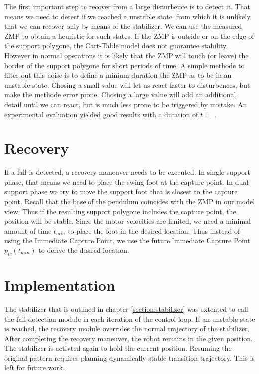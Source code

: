 \documentclass[english,ngerman]{KITreprt}
\newcommand{\fixme}[1]{{\color{red}{FIXME: #1}}}
\begin{document}
The first important step to recover from a large disturbence is to
detect it. That means we need to detect if we reached a unstable state,
from which it is unlikely that we can recover only by means of the
stabilizer. We can use the measured ZMP to obtain a heuristic for such
states. If the ZMP is outside or on the edge of the support polygone,
the Cart-Table model does not guarantee stability. However in normal
operations it is likely that the ZMP will touch (or leave) the border of
the support polygone for short periods of time. A simple methode to
filter out this noise is to define a minium duration the ZMP as to be in
an unstable state. Chosing a small value will let us react faster to
disturbences, but make the methode error prone. Chosing a large value
will add an additional detail until we can react, but is much less prone
to be triggered by mistake. An experimental evaluation yielded good
results with a duration of $t = $ \fixme{add real time here}.

\section{Recovery}\label{recovery}

If a fall is detected, a recovery maneuver needs to be executed. In
single support phase, that means we need to place the swing foot at the
capture point. In dual support phase we try to move the support foot
that is closest to the capture point. Recall that the base of the
pendulum coincides with the ZMP in our model view. Thus if the resulting
support polygone includes the capture point, the position will be
stable. Since the motor velocities are limited, we need a minimal amount
of time $t_{min}$ to place the foot in the desired location. Thus
instead of using the Immediate Capture Point, we use the future
Immediate Capture Point $p_{ic}(t_{min})$ to derive the desired
location.

\section{Implementation}\label{implementation-2}

The stabilizer that is outlined in chapter \ref{section:stabilizer} was
extented to call the fall detection module in each iteration of the
control loop. If an unstable state is reached, the recovery module
overrides the normal trajectory of the stabilizer. After completing the
recovery maneuver, the robot remains in the given position. The
stabilizer is activted again to hold the current position. Resuming the
original pattern requires planning dynamically stable transition
trajectory. This is left for future work.
\end{document}
